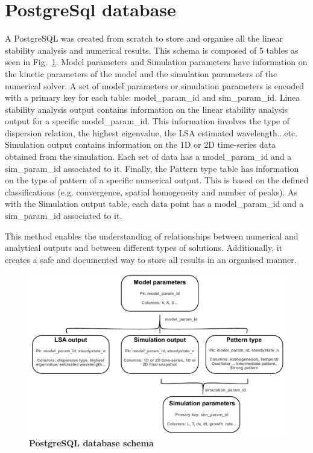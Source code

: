 \section{PostgreSql database}\label{PostgreSql database}
A PostgreSQL was created from scratch to store and organise all the linear stability analysis and numerical results.
This schema is composed of 5 tables as seen in Fig.~\ref{psql_schema}.
Model parameters and Simulation parameters have information on the kinetic parameters of the model and the simulation parameters of the numerical solver.
A set of model parameters or simulation parameters is encoded with a primary key for each table: model\_param\_id and sim\_param\_id.
Linea stability analysis output contains information on the linear stability analysis output for a specific model\_param\_id.
This information involves the type of dispersion relation, the highest eigenvalue, the LSA estimated wavelength...etc.
Simulation output contains information on the \acrfull{1D} or \acrfull{2D} time-series data obtained from the simulation. Each set of data has a model\_param\_id and a sim\_param\_id associated to it.
Finally, the Pattern type table has information on the type of pattern of a specific numerical output.
This is based on the defined classifications (e.g. convergence, spatial homogeneity and number of peaks).
As with the Simulation output table, each data point has a model\_param\_id and a sim\_param\_id associated to it.

This method enables the understanding of relationships between numerical and analytical outputs and between different types of solutions.
Additionally, it creates a safe and documented way to store all results in an organised manner.

\begin{figure}[H]

    \includegraphics[width=1\textwidth]{chapters/Methods/psql_schema}
    \caption{\textbf{PostgreSQL database schema}}
    \label{psql_schema}
\end{figure}

